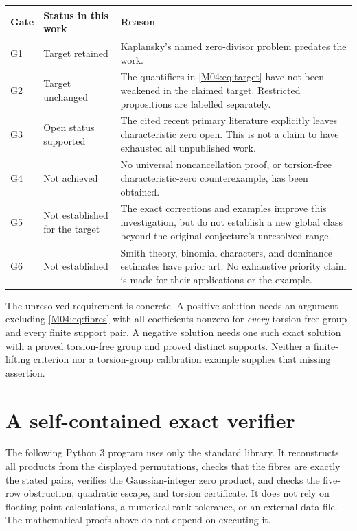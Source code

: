 \documentclass[11pt,a4paper,oneside]{report}
\theoremstyle{definition}
\theoremstyle{remark}
\begin{document}
\begin{center}
\begin{tabular}{@{}P{10mm}P{34mm}P{107mm}@{}}
\toprule
Gate&Status in this work&Reason\\
\midrule
G1&Target retained&Kaplansky's named zero-divisor problem predates the work.\\[3pt]
G2&Target unchanged&The quantifiers in \eqref{M04:eq:target} have not been weakened in the claimed target. Restricted propositions are labelled separately.\\[3pt]
G3&Open status supported&The cited recent primary literature explicitly leaves characteristic zero open. This is not a claim to have exhausted all unpublished work.\\[3pt]
G4&Not achieved&No universal noncancellation proof, or torsion-free characteristic-zero counterexample, has been obtained.\\[3pt]
G5&Not established for the target&The exact corrections and examples improve this investigation, but do not establish a new global class beyond the original conjecture's unresolved range.\\[3pt]
G6&Not established&Smith theory, binomial characters, and dominance estimates have prior art. No exhaustive priority claim is made for their applications or the example.\\
\bottomrule
\end{tabular}
\end{center}

The unresolved requirement is concrete. A positive solution needs an
argument excluding \eqref{M04:eq:fibres} with all coefficients nonzero for
\emph{every} torsion-free group and every finite support pair. A negative
solution needs one such exact solution with a proved torsion-free group
and proved distinct supports. Neither a finite-lifting criterion nor a
torsion-group calibration example supplies that missing assertion.


\section{A self-contained exact verifier}

The following Python 3 program uses only the standard library. It
reconstructs all products from the displayed permutations, checks that
the fibres are exactly the stated pairs, verifies the Gaussian-integer
zero product, and checks the five-row obstruction, quadratic escape, and
torsion certificate. It does not rely on floating-point calculations,
a numerical rank tolerance, or an external data file. The mathematical
proofs above do not depend on executing it.
\end{document}
